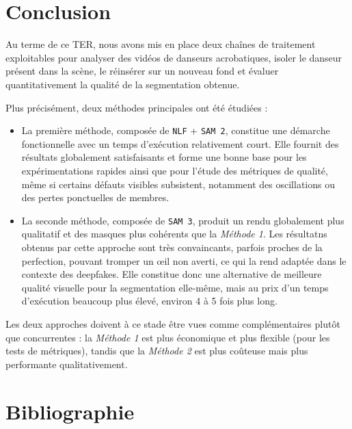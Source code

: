 \documentclass[11pt,a4paper]{article}
\begin{document}
\section{Conclusion}
Au terme de ce TER, nous avons mis en place deux chaînes de traitement exploitables pour analyser des vidéos de danseurs acrobatiques, isoler le danseur présent dans la scène, le réinsérer sur un nouveau fond et évaluer quantitativement la qualité de la segmentation obtenue.

Plus précisément, deux méthodes principales ont été étudiées :
\begin{itemize}
    \item La première méthode, composée de \texttt{NLF} + \texttt{SAM 2}, constitue une démarche fonctionnelle avec un temps d'exécution relativement court.
    Elle fournit des résultats globalement satisfaisants et forme une bonne base pour les expérimentations rapides ainsi que pour l'étude des métriques de qualité, même si certains défauts visibles subsistent, notamment des oscillations ou des pertes ponctuelles de membres.
    \item La seconde méthode, composée de \texttt{SAM 3}, produit un rendu globalement plus qualitatif et des masques plus cohérents que la \textit{Méthode 1}.
    Les résultatns obtenus par cette approche sont très convaincants, parfois proches de la perfection, pouvant tromper un œil non averti, ce qui la rend adaptée dans le contexte des deepfakes.
    Elle constitue donc une alternative de meilleure qualité visuelle pour la segmentation elle-même, mais au prix d'un temps d'exécution beaucoup plus élevé, environ 4 à 5 fois plus long.
\end{itemize}

Les deux approches doivent à ce stade être vues comme complémentaires plutôt que concurrentes : la \textit{Méthode 1} est plus économique et plus flexible (pour les tests de métriques), tandis que la \textit{Méthode 2} est plus coûteuse mais plus performante qualitativement.

\newpage
\section*{Bibliographie}
\end{document}
